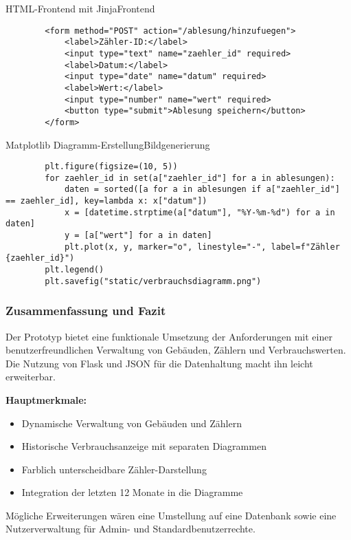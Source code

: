\begin{code}{HTML-Frontend mit Jinja}{Frontend}
    \begin{verbatim}
        <form method="POST" action="/ablesung/hinzufuegen">
            <label>Zähler-ID:</label>
            <input type="text" name="zaehler_id" required>
            <label>Datum:</label>
            <input type="date" name="datum" required>
            <label>Wert:</label>
            <input type="number" name="wert" required>
            <button type="submit">Ablesung speichern</button>
        </form>
    \end{verbatim}
\end{code}

\begin{code}{Matplotlib Diagramm-Erstellung}{Bildgenerierung}
    \begin{verbatim}
        plt.figure(figsize=(10, 5))
        for zaehler_id in set(a["zaehler_id"] for a in ablesungen):
            daten = sorted([a for a in ablesungen if a["zaehler_id"] == zaehler_id], key=lambda x: x["datum"])
            x = [datetime.strptime(a["datum"], "%Y-%m-%d") for a in daten]
            y = [a["wert"] for a in daten]
            plt.plot(x, y, marker="o", linestyle="-", label=f"Zähler {zaehler_id}")
        plt.legend()
        plt.savefig("static/verbrauchsdiagramm.png")
    \end{verbatim}
\end{code}

\subsubsection{Zusammenfassung und Fazit}

Der Prototyp bietet eine funktionale Umsetzung der Anforderungen mit einer benutzerfreundlichen Verwaltung von Gebäuden, Zählern und Verbrauchswerten. Die Nutzung von Flask und JSON für die Datenhaltung macht ihn leicht erweiterbar.

\textbf{Hauptmerkmale:}
\begin{itemize}
    \item Dynamische Verwaltung von Gebäuden und Zählern
    \item Historische Verbrauchsanzeige mit separaten Diagrammen
    \item Farblich unterscheidbare Zähler-Darstellung
    \item Integration der letzten 12 Monate in die Diagramme
\end{itemize}

Mögliche Erweiterungen wären eine Umstellung auf eine Datenbank sowie eine Nutzerverwaltung für Admin- und Standardbenutzerrechte.